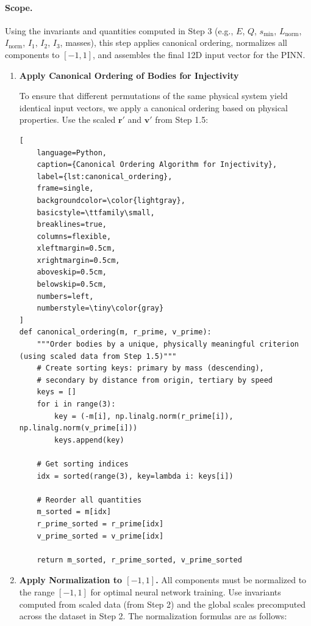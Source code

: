 \paragraph{Scope.}
Using the invariants and quantities computed in Step 3 
(e.g., $E$, $Q$, $s_{\min}$, $L_{\text{norm}}$, $I_{\text{norm}}$, $I_1$, $I_2$, $I_3$, masses), 
this step applies canonical ordering, normalizes all components to $[-1,1]$, and assembles the final 12D input vector for the PINN.


\begin{enumerate}
    \item \textbf{Apply Canonical Ordering of Bodies for Injectivity}
    
    To ensure that different permutations of the same physical system yield identical input vectors, we apply a canonical ordering based on physical properties. Use the scaled \(\mathbf{r}'\) and \(\mathbf{v}'\) from Step 1.5:


    
\begin{lstlisting}[
    language=Python,
    caption={Canonical Ordering Algorithm for Injectivity},
    label={lst:canonical_ordering},
    frame=single,
    backgroundcolor=\color{lightgray},
    basicstyle=\ttfamily\small,
    breaklines=true,
    columns=flexible,
    xleftmargin=0.5cm,
    xrightmargin=0.5cm,
    aboveskip=0.5cm,
    belowskip=0.5cm,
    numbers=left,
    numberstyle=\tiny\color{gray}
]
def canonical_ordering(m, r_prime, v_prime):
    """Order bodies by a unique, physically meaningful criterion (using scaled data from Step 1.5)"""
    # Create sorting keys: primary by mass (descending), 
    # secondary by distance from origin, tertiary by speed
    keys = []
    for i in range(3):
        key = (-m[i], np.linalg.norm(r_prime[i]), np.linalg.norm(v_prime[i]))
        keys.append(key)
    
    # Get sorting indices
    idx = sorted(range(3), key=lambda i: keys[i])
    
    # Reorder all quantities
    m_sorted = m[idx]
    r_prime_sorted = r_prime[idx]
    v_prime_sorted = v_prime[idx]
    
    return m_sorted, r_prime_sorted, v_prime_sorted
\end{lstlisting}



    \item \textbf{Apply Normalization to $[-1,1]$.}
    All components must be normalized to the range $[-1,1]$ for optimal neural network training. Use invariants computed from scaled data (from Step 2) and the global scales precomputed across the dataset in Step 2. The normalization formulas are as follows:


\end{enumerate}
